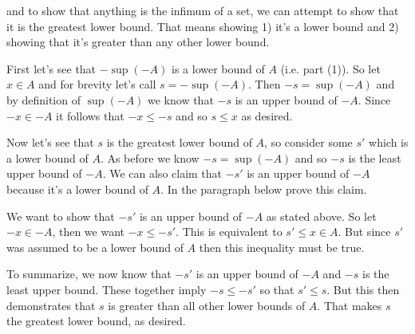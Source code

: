 \documentclass{article}
\begin{document}
	and to show that anything is the infimum of a set, we can attempt to show that it is the greatest lower bound.  That means showing 1) it's a lower bound and 2) showing that it's greater than any other lower bound.

	First let's see that $-\sup (-A)$ is a lower bound of $A$ (i.e. part (1)).  So let $x\in A$ and for brevity let's call $s = -\sup(-A)$.  Then $-s = \sup (-A)$ and by definition of $\sup(-A)$ we know that $-s$ is an upper bound of $-A$.  Since $-x\in -A$ it follows that $-x\leq -s$ and so $s\leq x$ as desired.

	Now let's see that $s$ is the greatest lower bound of $A$, so consider some $s'$ which is a lower bound of $A$.  As before we know $-s = \sup (-A)$ and so $-s$ is the least upper bound of $-A$.  We can also claim that $-s'$ is an upper bound of $-A$ because it's a lower bound of $A$.  In the paragraph below prove this claim.

	We want to show that $-s'$ is an upper bound of $-A$ as stated above.  So let $-x\in -A$, then we want $-x\leq -s'$.  This is equivalent to $s' \leq x \in A$.  But since $s'$ was assumed to be a lower bound of $A$ then this inequality must be true.

	To summarize, we now know that $-s'$ is an upper bound of $-A$ and $-s$ is the least upper bound.  These together imply $-s \leq -s'$ so that $s' \leq s$.  But this then demonstrates that $s$ is greater than all other lower bounds of $A$.  That makes $s$ the greatest lower bound, as desired.
\end{document}
